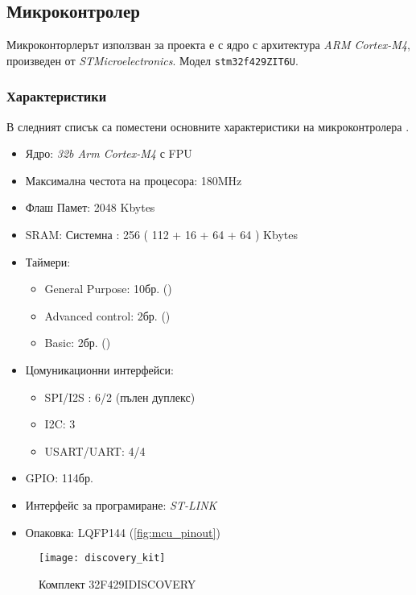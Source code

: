 \subsection{Микроконтролер}
\FloatBarrier

Микроконторлерът използван за проекта е с ядро с архитектура \textit{ARM Cortex-M4},
произведен от \textit{STMicroelectronics}.
Модел \texttt{stm32f429ZIT6U}.

\subsubsection{Характеристики}

В следният списък са поместени основните характеристики
на микроконтролера \cite{stmmcudatasheet}.

\begin{itemize} 
    \item Ядро: \textit{32b Arm Cortex-M4} с FPU
    \item Максимална честота на процесора: 180MHz
    \item Флаш Памет: 2048 Kbytes
    \item SRAM: Системна : 256 ( 112 + 16 + 64 + 64 ) Kbytes
    \item Таймери:
    \begin{itemize} 
        \item General Purpose: 10бр. ()
        \item Advanced control: 2бр. ()
        \item Basic: 2бр. ()
    \end{itemize}     
    \item Цомуникационни интерфейси:
    \begin{itemize}
        \item SPI/I2S : 6/2 (пълен дуплекс) 
        \item I2C: 3
        \item USART/UART: 4/4
    \end{itemize} 
    
    \item GPIO: 114бр.
    \item Интерфейс за програмиране: \textit{ST-LINK}
    \item Опаковка: LQFP144 (\autoref{fig:mcu_pinout})
\end{itemize}

\begin{figure}[htpb!]
    \centering
    \texttt{[image: discovery\_kit]}
    \caption{Комплект 32F429IDISCOVERY}
    \label{fig:discovery_kit}
\end{figure}

